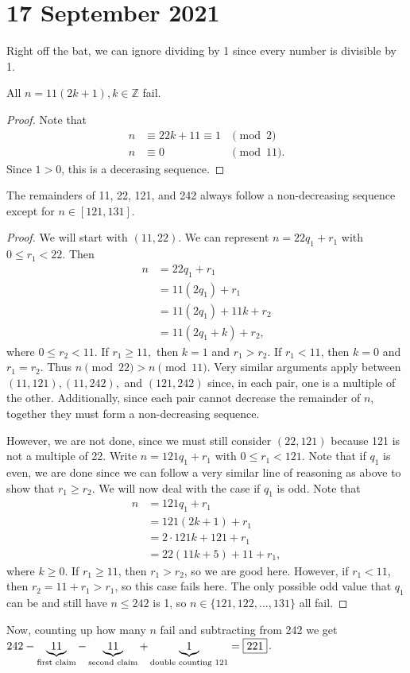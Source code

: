 \documentclass[letterpaper,oneside]{scrartcl}
\providecommand{\ZZ}{\mathbb Z}
\begin{document}
\section*{17 September 2021}
Right off the bat, we can ignore dividing by 1 since every number is divisible by 1.
\begin{claim*}
    All \(n=11(2k+1), k \in \ZZ\) fail.
\end{claim*}
\begin{proof}
    Note that
    \begin{align*}
        n & \equiv 22k+11 \equiv 1 & \pmod{2}   \\
        n & \equiv 0               & \pmod{11}.
    \end{align*}
    Since \(1>0\), this is a decerasing sequence.
\end{proof}
\begin{claim*}
    The remainders of 11, 22, 121, and 242 always follow a non-decreasing sequence except for \(n \in [121,131]\).
\end{claim*}
\begin{proof}
    We will start with \((11,22)\). We can represent \(n = 22q_1+r_1\) with \(0 \leq r_1 < 22\). Then
    \begin{align*}
        n & = 22q_1 + r_1          \\
          & = 11(2q_1) + r_1       \\
          & = 11(2q_1) + 11k + r_2 \\
          & = 11(2q_1+k) + r_2,
    \end{align*}
    where \(0\leq r_2 < 11\). If \(r_1\geq 11,\) then \(k=1\) and \(r_1 > r_2\). If \(r_1 < 11\), then \(k=0\) and \(r_1=r_2\). Thus \(n\pmod{22}>n\pmod{11}\). Very similar arguments apply between \((11,121),(11,242),\) and \((121,242)\) since, in each pair, one is a multiple of the other. Additionally, since each pair cannot decrease the remainder of \(n\), together they must form a non-decreasing sequence.
    
    However, we are not done, since we must still consider \((22,121)\) because 121 is not a multiple of 22. Write \(n=121q_1+r_1\) with \(0 \leq r_1 < 121\). Note that if \(q_1\) is even, we are done since we can follow a very similar line of reasoning as above to show that \(r_1 \geq r_2\). We will now deal with the case if \(q_1\) is odd. Note that
    \begin{align*}
        n & = 121q_1+r_1         \\
          & = 121(2k+1)+r_1      \\
          & = 2\cdot121k+121+r_1 \\
          & = 22(11k+5)+11+r_1,
    \end{align*}
    where \(k\geq0\). If \(r_1\geq11\), then \(r_1 > r_2\), so we are good here. However, if \(r_1 <11\), then \(r_2=11+r_1>r_1\), so this case fails here. The only possible odd value that \(q_1\) can be and still have \(n\leq 242\) is 1, so \(n \in \{121,122,...,131\}\) all fail.
\end{proof}
Now, counting up how many \(n\) fail and subtracting from 242 we get \(242-\underbrace{11}_{\text{first claim}}-\underbrace{11}_{\text{second claim}}+\underbrace{1}_{\text{double counting } 121} = \fbox{221}\).
\end{document}
